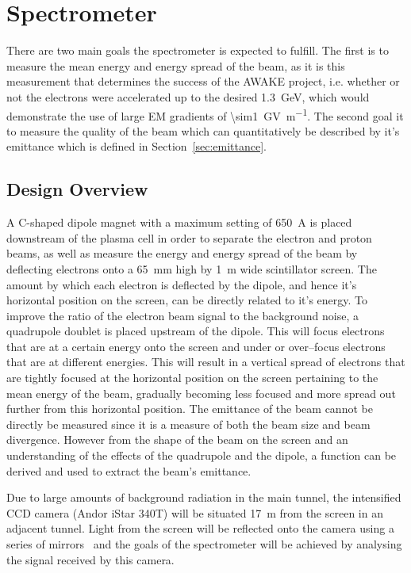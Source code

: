 
\section{Spectrometer}
\label{sec:spectrometer}

There are two main goals the spectrometer is expected to fulfill. The first is
to measure the mean energy and energy spread of the beam, as it is this
measurement that determines the success of the AWAKE project, i.e.  whether or
not the electrons were accelerated up to the desired
\SI{1.3}{\giga\electronvolt}, which would demonstrate the use of large EM
gradients of \SI{\sim1}{\giga\volt\per\meter}. The second goal it to measure the
quality of the beam which can quantitatively be described by it's emittance
which is defined in Section~\ref{sec:emittance}.


\subsection{Design Overview}

A C-shaped dipole magnet with a maximum setting of \SI{650}{\ampere} is placed
downstream of the plasma cell in order to separate the electron and proton
beams, as well as measure the energy and energy spread of the beam by deflecting
electrons onto a \SI{65}{\milli\meter} high by \SI{1}{\meter} wide scintillator
screen. The amount by which each electron is deflected by the dipole, and hence
it's horizontal position on the screen, can be directly related to it's energy.
To improve the ratio of the electron beam signal to the background noise, a
quadrupole doublet is placed upstream of the dipole.  This will focus electrons
that are at a certain energy onto the screen and under or over--focus electrons
that are at different energies. This will result in a vertical spread of
electrons that are tightly focused at the horizontal position on the screen
pertaining to the mean energy of the beam, gradually becoming less focused and
more spread out further from this horizontal position. The emittance of the
beam cannot be directly be measured since it is a measure of both the beam size
and beam divergence. However from the shape of the beam on the screen and an
understanding of the effects of the quadrupole and the dipole, a function can be
derived and used to extract the beam's emittance.

Due to large amounts of background radiation in the main tunnel, the intensified
CCD camera (Andor iStar 340T) will be situated \SI{17}{\meter} from the screen
in an adjacent tunnel. Light from the screen will be reflected onto the camera
using a series of mirrors~\cite{deacon2016qjq} and the goals of the spectrometer
will be achieved by analysing the signal received by this camera.

